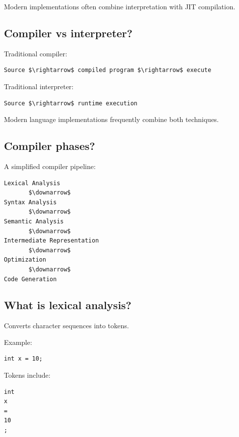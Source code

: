 Modern implementations often combine interpretation with JIT compilation.

\medskip

\subsection{Compiler vs interpreter?}

Traditional compiler:

\begin{lstlisting}
Source $\rightarrow$ compiled program $\rightarrow$ execute
\end{lstlisting}

Traditional interpreter:

\begin{lstlisting}
Source $\rightarrow$ runtime execution
\end{lstlisting}

Modern language implementations frequently combine both techniques.

\medskip

\subsection{Compiler phases?}

A simplified compiler pipeline:

\begin{lstlisting}
Lexical Analysis
       $\downarrow$
Syntax Analysis
       $\downarrow$
Semantic Analysis
       $\downarrow$
Intermediate Representation
       $\downarrow$
Optimization
       $\downarrow$
Code Generation
\end{lstlisting}

\medskip

\subsection{What is lexical analysis?}

Converts character sequences into tokens.

Example:

\begin{lstlisting}
int x = 10;
\end{lstlisting}

Tokens include:

\begin{lstlisting}
int
x
=
10
;
\end{lstlisting}

\medskip

